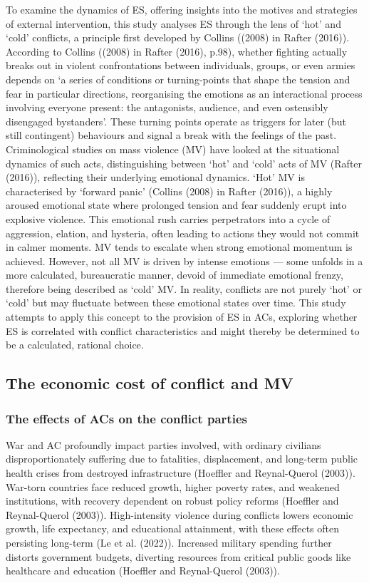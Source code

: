 \documentclass[
]{article}
\begin{document}
To examine the dynamics of ES, offering insights into the motives and
strategies of external intervention, this study analyses ES through the
lens of `hot' and `cold' conflicts, a principle first developed by
Collins ((2008) in Rafter (2016)). According to Collins ((2008) in
Rafter (2016), p.98), whether fighting actually breaks out in violent
confrontations between individuals, groups, or even armies depends on `a
series of conditions or turning-points that shape the tension and fear
in particular directions, reorganising the emotions as an interactional
process involving everyone present: the antagonists, audience, and even
ostensibly disengaged bystanders'. These turning points operate as
triggers for later (but still contingent) behaviours and signal a break
with the feelings of the past. Criminological studies on mass violence
(MV) have looked at the situational dynamics of such acts,
distinguishing between `hot' and `cold' acts of MV (Rafter (2016)),
reflecting their underlying emotional dynamics. `Hot' MV is
characterised by `forward panic' (Collins (2008) in Rafter (2016)), a
highly aroused emotional state where prolonged tension and fear suddenly
erupt into explosive violence. This emotional rush carries perpetrators
into a cycle of aggression, elation, and hysteria, often leading to
actions they would not commit in calmer moments. MV tends to escalate
when strong emotional momentum is achieved. However, not all MV is
driven by intense emotions --- some unfolds in a more calculated,
bureaucratic manner, devoid of immediate emotional frenzy, therefore
being described as `cold' MV. In reality, conflicts are not purely `hot'
or `cold' but may fluctuate between these emotional states over time.
This study attempts to apply this concept to the provision of ES in ACs,
exploring whether ES is correlated with conflict characteristics and
might thereby be determined to be a calculated, rational choice.

\subsection{The economic cost of conflict and
MV}\label{the-economic-cost-of-conflict-and-mv}

\subsubsection{The effects of ACs on the conflict
parties}\label{the-effects-of-acs-on-the-conflict-parties}

War and AC profoundly impact parties involved, with ordinary civilians
disproportionately suffering due to fatalities, displacement, and
long-term public health crises from destroyed infrastructure (Hoeffler
and Reynal-Querol (2003)). War-torn countries face reduced growth,
higher poverty rates, and weakened institutions, with recovery dependent
on robust policy reforms (Hoeffler and Reynal-Querol (2003)).
High-intensity violence during conflicts lowers economic growth, life
expectancy, and educational attainment, with these effects often
persisting long-term (Le et al. (2022)). Increased military spending
further distorts government budgets, diverting resources from critical
public goods like healthcare and education (Hoeffler and Reynal-Querol
(2003)).
\end{document}
